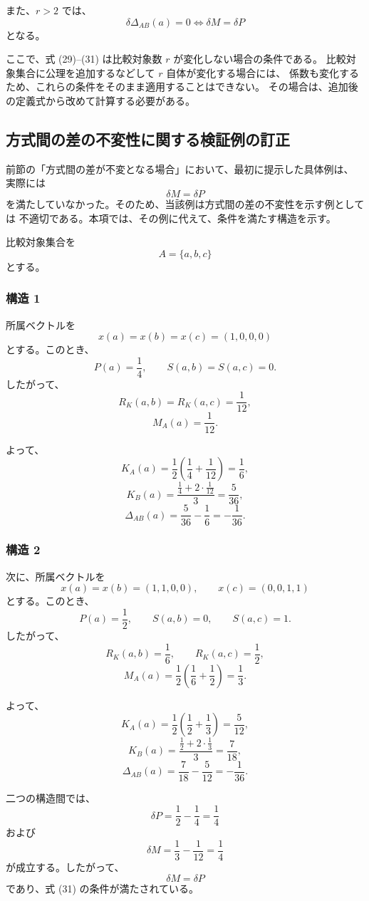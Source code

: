 \documentclass[a4paper,11pt]{ltjsarticle}
\begin{document}
また、$r>2$ では、
\[
\delta\Delta_{AB}(a)=0
\iff
\delta M=\delta P
\tag{31}
\]
となる。

ここで、式 (29)--(31) は比較対象数 $r$ が変化しない場合の条件である。
比較対象集合に公理を追加するなどして $r$ 自体が変化する場合には、
係数も変化するため、これらの条件をそのまま適用することはできない。
その場合は、追加後の定義式から改めて計算する必要がある。

\subsection{方式間の差の不変性に関する検証例の訂正}

前節の「方式間の差が不変となる場合」において、最初に提示した具体例は、
実際には
\[
\delta M=\delta P
\]
を満たしていなかった。そのため、当該例は方式間の差の不変性を示す例としては
不適切である。本項では、その例に代えて、条件を満たす構造を示す。

比較対象集合を
\[
A=\{a,b,c\}
\]
とする。

\subsubsection{構造 1}

所属ベクトルを
\[
x(a)=x(b)=x(c)=(1,0,0,0)
\]
とする。このとき、
\[
P(a)=\frac14,\qquad
S(a,b)=S(a,c)=0.
\]
したがって、
\[
R_K(a,b)=R_K(a,c)=\frac1{12},
\]
\[
M_A(a)=\frac1{12}.
\]

よって、
\[
K_A(a)=
\frac12\left(\frac14+\frac1{12}\right)
=\frac16,
\]
\[
K_B(a)=
\frac{\frac14+2\cdot\frac1{12}}{3}
=\frac5{36},
\]
\[
\Delta_{AB}(a)
=\frac5{36}-\frac16
=-\frac1{36}.
\]

\subsubsection{構造 2}

次に、所属ベクトルを
\[
x(a)=x(b)=(1,1,0,0),\qquad
x(c)=(0,0,1,1)
\]
とする。このとき、
\[
P(a)=\frac12,\qquad
S(a,b)=0,\qquad S(a,c)=1.
\]
したがって、
\[
R_K(a,b)=\frac16,\qquad
R_K(a,c)=\frac12,
\]
\[
M_A(a)=\frac12\left(\frac16+\frac12\right)
=\frac13.
\]

よって、
\[
K_A(a)=
\frac12\left(\frac12+\frac13\right)
=\frac5{12},
\]
\[
K_B(a)=
\frac{\frac12+2\cdot\frac13}{3}
=\frac7{18},
\]
\[
\Delta_{AB}(a)
=\frac7{18}-\frac5{12}
=-\frac1{36}.
\]

二つの構造間では、
\[
\delta P=\frac12-\frac14=\frac14
\]
および
\[
\delta M=\frac13-\frac1{12}=\frac14
\]
が成立する。したがって、
\[
\delta M=\delta P
\]
であり、式 (31) の条件が満たされている。
\end{document}
